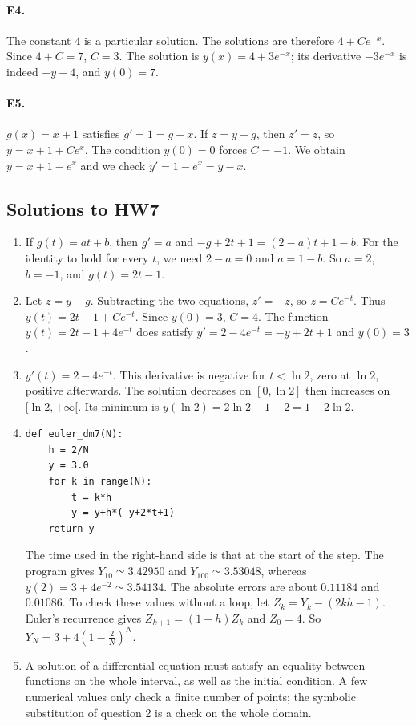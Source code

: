 \paragraph{E4.}The constant $4$ is a particular solution. The solutions are therefore $4+Ce^{-x}$. Since $4+C=7$, $C=3$. The solution is $y(x)=4+3e^{-x}$; its derivative $-3e^{-x}$ is indeed $-y+4$, and $y(0)=7$.

\paragraph{E5.}$g(x)=x+1$ satisfies $g'=1=g-x$. If $z=y-g$, then $z'=z$, so $y=x+1+Ce^x$. The condition $y(0)=0$ forces $C=-1$. We obtain $y=x+1-e^x$ and we check $y'=1-e^x=y-x$.

\subsection{Solutions to HW7}\begin{enumerate}
\item If $g(t)=at+b$, then $g'=a$ and $-g+2t+1=(2-a)t+1-b$. For the identity to hold for every $t$, we need $2-a=0$ and $a=1-b$. So $a=2$, $b=-1$, and $g(t)=2t-1$.
\item Let $z=y-g$. Subtracting the two equations, $z'=-z$, so $z=Ce^{-t}$. Thus $y(t)=2t-1+Ce^{-t}$. Since $y(0)=3$, $C=4$. The function $y(t)=2t-1+4e^{-t}$ does satisfy $y'=2-4e^{-t}=-y+2t+1$ and $y(0)=3$.
\item $y'(t)=2-4e^{-t}$. This derivative is negative for $t<\ln2$, zero at $\ln2$, positive afterwards. The solution decreases on $[0,\ln2]$ then increases on $[\ln2,+\infty[$. Its minimum is $y(\ln2)=2\ln2-1+2=1+2\ln2$.
\item
\begin{lstlisting}
def euler_dm7(N):
    h = 2/N
    y = 3.0
    for k in range(N):
        t = k*h
        y = y+h*(-y+2*t+1)
    return y
\end{lstlisting}
The time used in the right-hand side is that at the start of the step. The program gives $Y_{10}\simeq3.42950$ and $Y_{100}\simeq3.53048$, whereas $y(2)=3+4e^{-2}\simeq3.54134$. The absolute errors are about $0.11184$ and $0.01086$.
To check these values without a loop, let $Z_k=Y_k-(2kh-1)$. Euler's recurrence gives $Z_{k+1}=(1-h)Z_k$ and $Z_0=4$. So $Y_N=3+4(1-\frac{2}{N})^N$.
\item A solution of a differential equation must satisfy an equality between functions on the whole interval, as well as the initial condition. A few numerical values only check a finite number of points; the symbolic substitution of question 2 is a check on the whole domain.
\end{enumerate}

